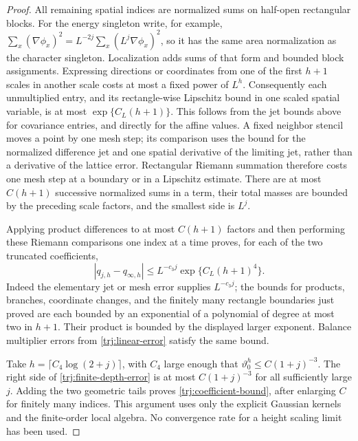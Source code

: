 \begin{proof}
All remaining spatial indices are normalized sums on half-open
rectangular blocks.  For the energy singleton write, for example,
\(\sum_x(\nabla\phi_x)^2=L^{-2j}\sum_x(L^j\nabla\phi_x)^2\), so it has
the same area normalization as the character singleton.  Localization
adds sums of that form and bounded block assignments.  Expressing
directions or coordinates from one of the first \(h+1\) scales in
another scale costs at most a fixed power of \(L^h\).  Consequently
each unmultiplied entry, and its rectangle-wise Lipschitz bound in one
scaled spatial variable, is at most \(\exp\{C_L(h+1)\}\).  This follows
from the jet bounds above for covariance entries, and directly for
the affine values.  A fixed neighbor stencil moves a point by one mesh
step; its comparison uses the bound for the normalized difference jet
and one spatial derivative of the limiting jet, rather than a derivative
of the lattice error.  Rectangular Riemann summation therefore costs
one mesh step at a boundary or in a Lipschitz estimate.  There are at
most \(C(h+1)\) successive normalized sums in a term, their total masses
are bounded by the preceding scale factors, and the smallest side is
\(L^j\).

Applying product differences to at most \(C(h+1)\) factors and then
performing these Riemann comparisons one index at a time proves, for
each of the two truncated coefficients,
\begin{equation}\label{trj:finite-depth-error}
 |q_{j,h}-q_{\infty,h}|
       \le L^{-c_3j}\exp\{C_L(h+1)^4\}.
\end{equation}
Indeed the elementary jet or mesh error supplies \(L^{-c_3j}\);
the bounds for products, branches, coordinate changes, and the
finitely many rectangle boundaries just proved are each bounded by
an exponential of a polynomial of degree at most two in \(h+1\).
Their product is bounded by the displayed larger exponent.  Balance
multiplier errors from \eqref{trj:linear-error} satisfy the same bound.

Take \(h=\lceil C_4\log(2+j)\rceil\), with \(C_4\) large enough that
\(\vartheta_0^h\le C(1+j)^{-3}\).  The right side
of \eqref{trj:finite-depth-error} is at most \(C(1+j)^{-3}\) for all
sufficiently large \(j\).  Adding the two geometric tails proves
\eqref{trj:coefficient-bound}, after enlarging \(C\) for finitely many
indices.  This argument uses only the explicit Gaussian kernels and
the finite-order local algebra.  No convergence rate for a height
scaling limit has been used.
\end{proof}

